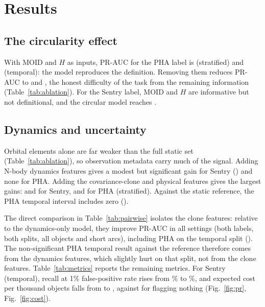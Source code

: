 \documentclass[journal]{IEEEtran}
\begin{document}
\section{Results}\label{sec:results}
\subsection{The circularity effect}
With MOID and $H$ as inputs, PR-AUC for the PHA label is \PRPhaStratifiedAllNaive{} (stratified) and \PRPhaTemporalAllNaive{} (temporal): the model reproduces the definition. Removing them reduces PR-AUC to \PRPhaStratifiedAllStatic{} and \PRPhaTemporalAllStatic{}, the honest difficulty of the task from the remaining information (Table~\ref{tab:ablation}). For the Sentry label, MOID and $H$ are informative but not definitional, and the circular model reaches \PRSentryStratifiedAllNaive.

\begin{table}[t]
\caption{Test PR-AUC of the leak-free reference and the circular baseline, and change in PR-AUC versus the reference with 95\% paired bootstrap intervals (5 seeds $\times$ 500 replicates). Bold: positive change whose interval excludes zero.}
\label{tab:ablation}
\centering

\end{table}

\subsection{Dynamics and uncertainty}
Orbital elements alone are far weaker than the full static set (Table~\ref{tab:ablation}), so observation metadata carry much of the signal. Adding N-body dynamics features gives a modest but significant gain for Sentry (\DSentryStratifiedAllDyn) and none for PHA. Adding the covariance-clone and physical features gives the largest gains: \DSentryStratifiedAllFull{} and \DSentryTemporalAllFull{} for Sentry, and \DPhaStratifiedAllFull{} for PHA (stratified). Against the static reference, the PHA temporal interval includes zero (\DPhaTemporalAllFull).

The direct comparison in Table~\ref{tab:pairwise} isolates the clone features: relative to the dynamics-only model, they improve PR-AUC in all \NSigUncOverDyn{} settings (both labels, both splits, all objects and short arcs), including PHA on the temporal split (\UncOverDynPhaTemporal). The non-significant PHA temporal result against the reference therefore comes from the dynamics features, which slightly hurt on that split, not from the clone features. Table~\ref{tab:metrics} reports the remaining metrics. For Sentry (temporal), recall at 1\% false-positive rate rises from \RecSentryTemporalAllStatic\% to \RecSentryTemporalAllFull\%, and expected cost per thousand objects falls from \CostSentryTemporalAllStatic{} to \CostSentryTemporalAllFull{}, against \TrivCostSentryTemporal{} for flagging nothing (Fig.~\ref{fig:pr}, Fig.~\ref{fig:cost}).
\end{document}
